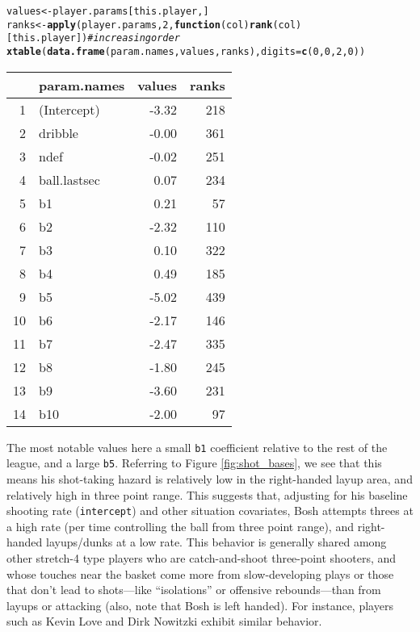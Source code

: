 \documentclass{article}\usepackage[]{graphicx}\usepackage[]{color}
\makeatletter
\newcommand{\hlnum}[1]{\textcolor[rgb]{0.686,0.059,0.569}{#1}}%
\newcommand{\hlcom}[1]{\textcolor[rgb]{0.678,0.584,0.686}{\textit{#1}}}%
\newcommand{\hlstd}[1]{\textcolor[rgb]{0.345,0.345,0.345}{#1}}%
\newcommand{\hlkwa}[1]{\textcolor[rgb]{0.161,0.373,0.58}{\textbf{#1}}}%
\newcommand{\hlkwb}[1]{\textcolor[rgb]{0.69,0.353,0.396}{#1}}%
\newcommand{\hlkwc}[1]{\textcolor[rgb]{0.333,0.667,0.333}{#1}}%
\newcommand{\hlkwd}[1]{\textcolor[rgb]{0.737,0.353,0.396}{\textbf{#1}}}%
\newenvironment{kframe}{%
 \def\at@end@of@kframe{}%
 \ifinner\ifhmode%
  \def\at@end@of@kframe{\end{minipage}}%
  \begin{minipage}{\columnwidth}%
 \fi\fi%
 \def\FrameCommand##1{\hskip\@totalleftmargin \hskip-\fboxsep
 \colorbox{shadecolor}{##1}\hskip-\fboxsep
     \hskip-\linewidth \hskip-\@totalleftmargin \hskip\columnwidth}%
 \MakeFramed {\advance\hsize-\width
   \@totalleftmargin\z@ \linewidth\hsize
   \@setminipage}}%
 {\par\unskip\endMakeFramed%
 \at@end@of@kframe}
\makeatother
\begin{document}
\begin{footnotesize}
\begin{kframe}
\begin{alltt}
\hlstd{values} \hlkwb{<-} \hlstd{player.params[this.player, ]}
\hlstd{ranks} \hlkwb{<-} \hlkwd{apply}\hlstd{(player.params,} \hlnum{2}\hlstd{,} \hlkwa{function}\hlstd{(}\hlkwc{col}\hlstd{)} \hlkwd{rank}\hlstd{(col)[this.player])} \hlcom{# increasing order}
\hlkwd{xtable}\hlstd{(}\hlkwd{data.frame}\hlstd{(param.names, values, ranks),} \hlkwc{digits}\hlstd{=}\hlkwd{c}\hlstd{(}\hlnum{0}\hlstd{,}\hlnum{0}\hlstd{,}\hlnum{2}\hlstd{,}\hlnum{0}\hlstd{))}
\end{alltt}
\end{kframe}%
\begin{table}[ht]
\centering
\begin{tabular}{rlrr}
  \hline
 & param.names & values & ranks \\ 
  \hline
1 & (Intercept) & -3.32 & 218 \\ 
  2 & dribble & -0.00 & 361 \\ 
  3 & ndef & -0.02 & 251 \\ 
  4 & ball.lastsec & 0.07 & 234 \\ 
  5 & b1 & 0.21 & 57 \\ 
  6 & b2 & -2.32 & 110 \\ 
  7 & b3 & 0.10 & 322 \\ 
  8 & b4 & 0.49 & 185 \\ 
  9 & b5 & -5.02 & 439 \\ 
  10 & b6 & -2.17 & 146 \\ 
  11 & b7 & -2.47 & 335 \\ 
  12 & b8 & -1.80 & 245 \\ 
  13 & b9 & -3.60 & 231 \\ 
  14 & b10 & -2.00 & 97 \\ 
   \hline
\end{tabular}
\end{table}

\end{footnotesize}

The most notable values here a small \texttt{b1} coefficient relative to the rest of the league, and a large \texttt{b5}. Referring to Figure \ref{fig:shot_bases}, we see that this means his shot-taking hazard is relatively low in the right-handed layup area, and relatively high in three point range. This suggests that, adjusting for his baseline shooting rate (\texttt{intercept}) and other situation covariates, Bosh attempts threes at a high rate (per time controlling the ball from three point range), and right-handed layups/dunks at a low rate. This behavior is generally shared among other stretch-4 type players who are catch-and-shoot three-point shooters, and whose touches near the basket come more from slow-developing plays or those that don't lead to shots---like ``isolations'' or offensive rebounds---than from layups or attacking (also, note that Bosh is left handed). For instance, players such as Kevin Love and Dirk Nowitzki exhibit similar behavior.
\end{document}
